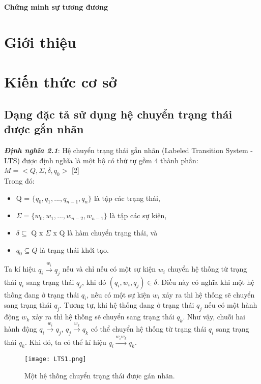 \documentclass[a4paper,13pt,oneside,openany]{book}
\begin{document}
	\begin{center}
		\textbf{\large Chứng minh sự tương đương}
	\end{center}
	\begin{flushleft}
	\chapter{Giới thiệu}
	\chapter{Kiến thức cơ sở}
		\section{Dạng đặc tả sử dụng hệ chuyển trạng thái được gắn nhãn}
		\justify
		\textbf{\textit{Định nghĩa 2.1}}: Hệ chuyển trạng thái gắn nhãn (Labeled Transition System - LTS) được định nghĩa là một bộ có thứ tự gồm 4 thành phần: $M = <Q, \Sigma, \delta, q_{0}>$ [2]\\
		Trong đó:\\
		\begin{itemize}
			\item Q = $\{q_{0}, q_{1}, ..., q_{n-1}, q_{n}\}$ là tập các trạng thái,
			\item $\Sigma = \{w_{0}, w_{1}, ..., w_{n-2}, w_{n-1}\}$ là tập các sự kiện,
			\item $\delta \subseteq$ Q x $\Sigma$ x Q là hàm chuyển trạng thái, và
			\item $q_{0} \subseteq Q$ là trạng thái khởi tạo.\\
		\end{itemize}
		Ta kí hiệu $q_i \overset{w_i}{\longrightarrow} q_{j}$ nếu và chỉ nếu có một sự kiện $w_i$ chuyển hệ thống từ trạng thái $q_i$ sang trạng thái $q_j$, khi đó $(q_i, w_i, q_j) \in \delta$. Điều này có nghĩa khi một hệ thống đang ở trạng thái $q_i$, nếu có một sự kiện $w_i$ xảy ra thì hệ thống sẽ chuyển sang trạng thái $q_j$. Tương tự, khi hệ thống đang ở trạng thái $q_j$ nếu có một hành động $w_k$ xảy ra thì hệ thống sẽ chuyển sang trạng thái $q_k$. Như vậy, chuỗi hai hành động  $q_i \overset{w_i}{\longrightarrow} q_j$,  $q_j \overset{w_k}{\longrightarrow} q_k$ có thể chuyển hệ thống từ trạng thái $q_i$ sang trạng thái $q_k$. Khi đó, ta có thể kí hiệu  $q_i \overset{w_iw_k}{\longrightarrow} q_{k}$.\\
		\begin{figure}[h]
			\centering
			\texttt{[image: LTS1.png]}
			\caption{Một hệ thống chuyển trạng thái được gán nhãn.}

\end{figure}
\end{flushleft}
\end{document}
